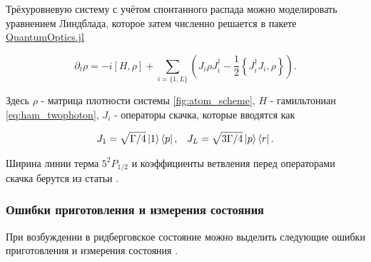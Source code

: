 Трёхуровневую систему с учётом спонтанного распада можно моделировать уравнением Линдблада, которое затем численно решается в пакете \href{https://www.qojulia.org/}{QuantumOptics.jl} \cite{kramer2018quantumoptics}

\begin{equation}
	\partial_t \rho = -i\left[H, \rho\right] + \sum_{i=\{1,L\}}\left(J_i \rho J_i^\dagger - \frac{1}{2}\left\{J_i^\dagger J_i, \rho\right\} \right).
\end{equation}

Здесь $\rho$ - матрица плотности системы \ref{fig:atom_scheme}, $H$ - гамильтониан \ref{eq:ham_twophoton}, $J_i$ - операторы скачка, которые вводятся как

\begin{equation}
	\begin{aligned}
		J_{1} = \sqrt{\Gamma/4}\left| 1 \right\rangle\left\langle p \right|, \;\;\; J_L = \sqrt{3\Gamma/4}\left| p \right\rangle\left\langle r \right|.
	\end{aligned}
\end{equation}

Ширина линии терма $5^2P_{1/2}$ и коэффициенты ветвления перед операторами скачка берутся из статьи \cite{Rb87}.


\subsubsection{Ошибки приготовления и измерения состояния}

При возбуждении в ридберговское состояние можно выделить следующие ошибки приготовления и измерения состояния \cite{Browayes}. 

